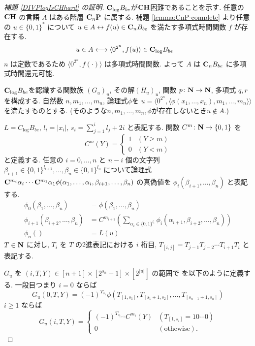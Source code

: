 \begin{proof}[\rm 補題 \ref{DIVPlogIsCHhard} の証明]
 $\mathbf{C}_{\log} B_{be}$が$\mathbf{CH}$困難であることを示す.
 任意の $\mathbf{CH}$ の言語 $A$ はある階層 $\mathbf{C}_n \mathbf{P}$ に属する. 
 補題 \ref{lemma:CnP-complete} より任意の $u \in \{0,1\}^*$ について
 $u \in A \leftrightarrow f(u) \in \mathbf{C}_n B_{be}$ 
 を満たす多項式時間関数 $f$ が存在する.
 \begin{align}
  u \in A 
  & \longleftrightarrow \langle 0^{2^n}, f(u) \rangle \in \mathbf{C}_{\log} B_{be}
 \end{align}
 $n$ は定数であるため $\langle 0^{2^n}, f(\cdot) \rangle$ は多項式時間関数.
 よって $A$ は $\mathbf{C}_n B_{be}$ に多項式時間還元可能.


 $\mathbf{C}_{\log} B_{be}$を認識する関数族 $(G_u)_u$, 
 その解$(H_u)_u$, 関数 $p \colon \mathbf N \to \mathbf N$, 多項式 $q,r$ を構成する.
 自然数 $n, m_1, \dots, m_n$, 論理式$\phi$を
 $u  = \langle 0^{2^n}, 
 \langle \phi(x_1, \dots, x_n), m_1, \dots, m_n \rangle \rangle$
 を満たすものとする. 
 (そのような$n, m_1, \dots, m_n, \phi$が存在しないとき$u \not \in A$.)
 
 
 $L = C_{\log} B_{be}$,
 $l_i = |x_i|$,
 $s_i = \sum^i_{j=1}l_j + 2i$  と表記する.
 関数 $C^m \colon \mathbf N \to \{0,1\}$ を
 \begin{equation}
  C^m(Y) 
     = \begin{cases}
       1 & (Y \ge m) \\
       0 & (Y < m) \end{cases}
 \end{equation}
 と定義する. 
 任意の $i = 0, \dots, n$ と $n-i$ 個の文字列 
 $\beta_{i+1} \in \{0,1\}^{l_{i+1}}, \dots, \beta_n \in \{0,1\}^{l_n}$ 
 について論理式
 $\mathbf{C}^{m_{i}}{\alpha_i} \cdots \mathbf{C}^{m_1}{\alpha_1}
 \phi(\alpha_1, \dots, \alpha_i, \beta_{i+1}, \dots, \beta_n)$
 の真偽値を $\phi_i(\beta_{i+1}, \dots, \beta_n)$ と表記する.
 \begin{align}
  \phi_0 (\beta_1, \dots, \beta_n) &= \phi(\beta_1, \dots, \beta_n)
  \\ \label{eq:phi-step}
  \phi_{i+1}(\beta_{i+2}, \dots, \beta_n) 
  &= C^{m_{i+1}}\left(\sum\nolimits_{\alpha_i \in \{0,1\}^{l_i}} 
  \phi_i(\alpha_{i+1}, \beta_{i+2}, \dots, \beta_{n})\right) 
  \\
  \phi_n() &= L(u) 
 \end{align}
 $T \in \mathbf N$ に対し, $T_i$ を $T$ の2進表記における $i$ 桁目, 
 $T_{[i,j]} = T_{j-1} T_{j-2} \cdots T_{i+1} T_{i}$ と表記する.


 $G_u$ を $(i, T, Y) \in [n+1] \times [2^{s_n}+1] \times [2^{|u|}]$ の範囲で
 を以下のように定義する. 一段目つまり $i=0$ ならば
 \begin{equation}
  G_u(0,T,Y) = 
   (-1)^{T_{s_1}}\phi(T_{[1,s_1]}, T_{[s_1+1,s_2]},
    \dots, T_{[s_{n-1}+1,s_n]}) 
 \end{equation}
 $i \ge 1$ ならば
 \begin{equation} \label{eq:def-Gu:case0}
  G_u(i,T,Y) = 
   \begin{cases}
    (-1)^{T_{s_{i+1}}} C^{m_i}(Y) 
    & (T_{[1,s_i]} = 10 \cdots 0) \\
    0 & (\text{othewise}).
   \end{cases} 
 \end{equation}



\end{proof}
